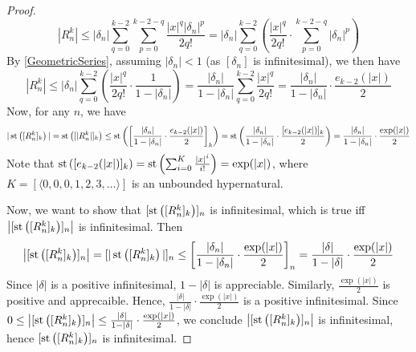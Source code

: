 \begin{proof}
    \[ |R_n^k| \leq |\delta_n|\sum_{q=0}^{k-2} \sum_{p=0}^{k-2-q} \frac{|x|^q |\delta_n|^p}{2q!} = |\delta_n| \sum_{q=0}^{k-2} \left(\frac{|x|^q}{2q!} \cdot \sum_{p=0}^{k-2-q} |\delta_n|^p \right) \]
    By \ref{GeometricSeries}, assuming $|\delta_n| < 1$ (as $[\delta_n]$ is infinitesimal), we then have
    \[ |R_n^k| \leq |\delta_n|  \sum_{q=0}^{k-2}\left(\frac{|x|^q}{2q!} \cdot \frac{1}{1-|\delta_n|}\right) = \frac{|\delta_n|}{1-|\delta_n|} \sum_{q=0}^{k-2} \frac{|x|^q}{2q!} = \frac{|\delta_n|}{1-|\delta_n|} \cdot \frac{e_{k-2}(|x|)}{2}\]
    Now, for any $n$, we have
    \[ |\operatorname{st}\left([R_n^k]_k\right)| = \operatorname{st}\left([|R_n^k|]_k\right) \leq \operatorname{st}\left(\left[\frac{|\delta_n|}{1-|\delta_n|} \cdot \frac{e_{k-2}(|x|)}{2}\right]_k\right) = \operatorname{st}\left(\frac{|\delta_n|}{1-|\delta_n|} \cdot \frac{[e_{k-2}(|x|)]_k}{2}\right) = \frac{|\delta_n|}{1-|\delta_n|} \cdot \frac{\exp(|x|)}{2} \]
    Note that $\operatorname{st}\left([e_{k-2}(|x|)]_k\right) = \operatorname{st}\left(\sum_{i=0}^K \frac{|x|^i}{i!}\right) = \exp(|x|)$, where $K = [\langle 0, 0, 0, 1, 2, 3, \ldots \rangle]$ is an unbounded hypernatural. 

    Now, we want to show that $[\operatorname{st}\left([R_n^k]_k\right)]_n$ is infinitesimal, which is true iff $\left|[\operatorname{st}\left([R_n^k]_k\right)]_n\right|$ is infinitesimal. Then
    \[\left|[\operatorname{st}\left([R_n^k]_k\right)]_n\right| = [|\operatorname{st}\left([R_n^k]_k\right)|]_n \leq \left[\frac{|\delta_n|}{1-|\delta_n|} \cdot \frac{\exp(|x|)}{2}\right]_n = \frac{|\delta|}{1-|\delta|} \cdot \frac{\exp(|x|)}{2}\] 
    Since $|\delta|$ is a positive infinitesimal, $1 - |\delta|$ is appreciable. Similarly, $\frac{\exp(|x|)}{2}$ is positive and apprecaible. Hence, $\frac{|\delta|}{1-|\delta|} \cdot \frac{\exp(|x|)}{2}$ is a positive infinitesimal. Since $0 \leq \left|[\operatorname{st}\left([R_n^k]_k\right)]_n\right| \leq \frac{|\delta|}{1-|\delta|} \cdot \frac{\exp(|x|)}{2}$, we conclude $\left|[\operatorname{st}\left([R_n^k]_k\right)]_n\right|$ is infinitesimal, hence $[\operatorname{st}\left([R_n^k]_k\right)]_n$ is infinitesimal.
\end{proof}